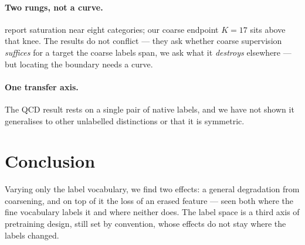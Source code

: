 \documentclass{article}
\begin{document}
\paragraph{Two rungs, not a curve.} \citet{mehta} report saturation near eight
categories; our coarse endpoint $K=17$ sits above that knee. The results do not
conflict --- they ask whether coarse supervision \emph{suffices} for a target the
coarse labels span, we ask what it \emph{destroys} elsewhere --- but locating the
boundary needs a curve.

\paragraph{One transfer axis.} The QCD result rests on a single pair of native
labels, and we have not shown it generalises to other unlabelled distinctions or
that it is symmetric.

\section{Conclusion}

Varying only the label vocabulary, we find two effects: a general degradation
from coarsening, and on top of it the loss of an erased feature --- seen both
where the fine vocabulary labels it and where neither does. The label space is a
third axis of pretraining design, still set by convention, whose effects do not
stay where the labels changed.



\end{document}
